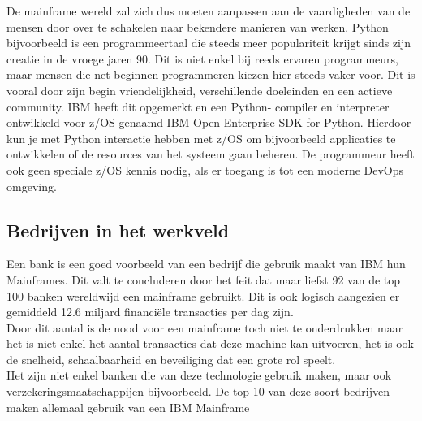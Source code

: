 De mainframe wereld zal zich dus moeten aanpassen aan de vaardigheden van de mensen door over te schakelen naar bekendere manieren van werken. 
Python bijvoorbeeld is een programmeertaal die steeds meer populariteit krijgt sinds zijn creatie in de vroege jaren 90. Dit is niet enkel bij reeds ervaren programmeurs, maar mensen die net beginnen programmeren kiezen hier steeds vaker voor. Dit is vooral door zijn begin vriendelijkheid, verschillende doeleinden en een actieve community. \autocite{Johnson2023}
IBM heeft dit opgemerkt en een Python- compiler en interpreter ontwikkeld voor z/OS genaamd IBM Open Enterprise SDK for Python. Hierdoor kun je met Python interactie hebben met z/OS om bijvoorbeeld applicaties te ontwikkelen of de resources van het systeem gaan beheren. De programmeur heeft ook geen speciale z/OS kennis nodig, als er toegang is tot een moderne DevOps omgeving. \autocite{Klaey2023}

\subsection{Bedrijven in het werkveld}
Een bank is een goed voorbeeld van een bedrijf die gebruik maakt van IBM hun Mainframes. Dit valt te concluderen door het feit dat maar liefst 92 van de top 100 banken wereldwijd een mainframe gebruikt. Dit is ook logisch aangezien er gemiddeld 12.6 miljard financiële transacties per dag zijn. \autocite{Wagle2017} \\
Door dit aantal is de nood voor een mainframe toch niet te onderdrukken maar het is niet enkel het aantal transacties dat deze machine kan uitvoeren, het is ook de snelheid, schaalbaarheid en beveiliging dat een grote rol speelt. \\
Het zijn niet enkel banken die van deze technologie gebruik maken, maar ook  verzekeringsmaatschappijen bijvoorbeeld. De top 10 van deze soort bedrijven maken allemaal gebruik van een IBM Mainframe \autocite{Tozzi2022}

